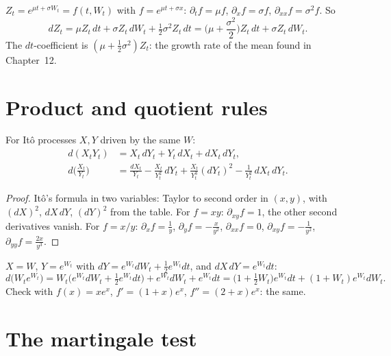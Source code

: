 \begin{example}
\label{ex:ito-gbm}
$Z_t=e^{\mu t+\sigma W_t}=f(t,W_t)$ with $f=e^{\mu t+\sigma x}$: $\partial_tf=\mu f$, $\partial_xf=\sigma f$, $\partial_{xx}f=\sigma^2f$. So
\[
  dZ_t=\mu Z_t\,dt+\sigma Z_t\,dW_t+\tfrac12\sigma^2Z_t\,dt=\Big(\mu+\frac{\sigma^2}2\Big)Z_t\,dt+\sigma Z_t\,dW_t .
\]
The $dt$-coefficient is $(\mu+\frac12\sigma^2)Z_t$: the growth rate of the mean found in Chapter~12.
\end{example}

\section{Product and quotient rules}

\begin{result}
\label{res:product}
For Itô processes $X,Y$ driven by the same $W$:
\[
  \begin{aligned}
  d(X_tY_t)&=X_t\,dY_t+Y_t\,dX_t+dX_t\,dY_t,\\
  d\Big(\frac{X_t}{Y_t}\Big)&=\frac{dX_t}{Y_t}-\frac{X_t}{Y_t^2}\,dY_t+\frac{X_t}{Y_t^3}(dY_t)^2-\frac{1}{Y_t^2}\,dX_t\,dY_t .
  \end{aligned}
\]
\end{result}
\begin{proof}
Itô's formula in two variables: Taylor to second order in $(x,y)$, with $(dX)^2$, $dX\,dY$, $(dY)^2$ from the table. For $f=xy$: $\partial_{xy}f=1$, the other second derivatives vanish. For $f=x/y$: $\partial_xf=\frac1y$, $\partial_yf=-\frac x{y^2}$, $\partial_{xx}f=0$, $\partial_{xy}f=-\frac1{y^2}$, $\partial_{yy}f=\frac{2x}{y^3}$.
\end{proof}

\begin{example}
$X=W$, $Y=e^{W_t}$ with $dY=e^{W_t}dW_t+\frac12e^{W_t}dt$, and $dX\,dY=e^{W_t}dt$:
\[
  d\big(W_te^{W_t}\big)=W_t\Big(e^{W_t}dW_t+\tfrac12e^{W_t}dt\Big)+e^{W_t}dW_t+e^{W_t}dt=\Big(1+\tfrac12W_t\Big)e^{W_t}dt+(1+W_t)e^{W_t}dW_t .
\]
Check with $f(x)=xe^x$, $f'=(1+x)e^x$, $f''=(2+x)e^x$: the same.
\end{example}

\section{The martingale test}

